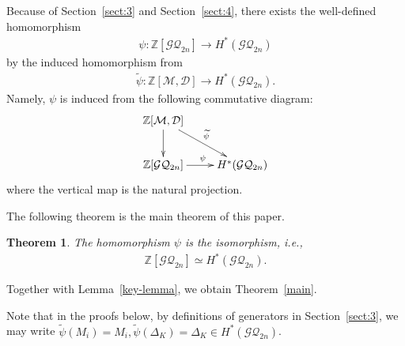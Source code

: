 \documentclass[12pt]{amsart}
\newtheorem{theorem}{Theorem}[section]
\theoremstyle{remark}
\numberwithin{equation}{section}
\begin{document}
Because of Section~\ref{sect:3} and Section~\ref{sect:4}, there exists the well-defined homomorphism 
\begin{align*}
\psi:\mathbb{Z}[\mathcal{GQ}_{2n}]\to H^{*}(\mathcal{GQ}_{2n})
\end{align*}
by the induced homomorphism from 
\begin{align*}
\widetilde{\psi}:\mathbb{Z}[\mathcal{M},\mathcal{D}]\to H^{*}(\mathcal{GQ}_{2n}).
\end{align*}
Namely, 
$\psi$ is induced from 
the following commutative diagram:
\begin{align}
\label{diagram}
\xymatrix{
\mathbb{Z}[\mathcal{M},\mathcal{D}] \ar[d] \ar[rd]^{\widetilde{\psi}} & \\
\mathbb{Z}[\mathcal{GQ}_{2n}]\ar[r]^{\psi} & H^{*}(\mathcal{GQ}_{2n})}
\end{align}
where the vertical map is the natural projection.

The following theorem is the main theorem of this paper. 
\begin{theorem}
\label{main-theorem2}
The homomorphism $\psi$ is the isomorphism, i.e., 
\begin{align*}
\mathbb{Z}[\mathcal{GQ}_{2n}]\simeq H^{*}(\mathcal{GQ}_{2n}).
\end{align*} 
\end{theorem}
Together with Lemma~\ref{key-lemma}, we obtain Theorem~\ref{main}.

Note that in the proofs below,
by definitions of generators in Section~\ref{sect:3}, 
we may write $\widetilde{\psi}(M_{i})=M_{i}, \widetilde{\psi}(\Delta_{K})=\Delta_{K}\in H^{*}(\mathcal{GQ}_{2n})$.

\end{document}

